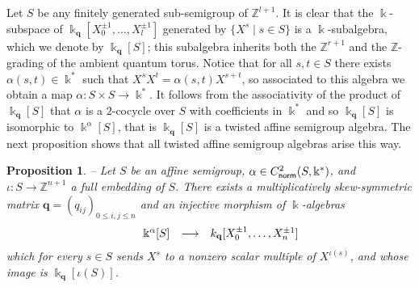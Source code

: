 \documentclass[twoside,11pt]{article}
\newcommand{\norm}{{\sf norm}}
\renewcommand{\k}{\Bbbk}
\newcommand{\Z}{{\mathbb Z}}
\newcommand{\q}{{\mathbf q}}
\newtheorem{subproposition}[subtheorem]{Proposition}
\begin{document}
Let $S$ be any finitely generated sub-semigroup of $\Z^{l+1}$. It is clear that the
$\k$-subspace of $\k_\q[X_0^{\pm 1},\dots,X_l^{\pm 1}]$ generated by $\{X^s \mid s\in S\}$
is a $\k$-subalgebra, which we denote by $\k_\q[S]$; this subalgebra inherits both the
$\Z^{r+1}$ and the $\Z$-grading of the ambient quantum torus. Notice that for all $s,t \in
S$ there exists $\alpha(s,t) \in \k^*$ such that $X^s X^t = \alpha(s,t) X^{s+t}$, so
associated to this algebra we obtain a map $\alpha: S \times S \longrightarrow \k^*$. It
follows from the associativity of the product of $\k_\q[S]$ that $\alpha$ is
a $2$-cocycle over $S$ with coefficients in $\k^*$ and so $\k_\q[S]$ is isomorphic to
$\k^\alpha[S]$, that is $\k_\q[S]$ is a twisted affine semigroup algebra. The next
proposition shows that all twisted affine semigroup algebras arise this way. 

\begin{subproposition} -- \label{full-affine-embedding} 
Let $S$ be an affine semigroup, $\alpha \in C^2_\norm(S,\k^*)$, and $\iota: S
\longrightarrow \Z^{n+1}$ a full embedding of $S$. There exists a multiplicatively
skew-symmetric matrix $\q=(q_{ij})_{0 \le i,j \le n}$ and an injective morphism of
$\k$-algebras
\[
\begin{array}{ccrcl}
 & & \k^\alpha[S] & \longrightarrow & k_\q[X_0^{\pm 1}, \ldots, X_n^{\pm 1}] \cr 
\end{array}
\]
which for every $s \in S$ sends $X^s$ to a nonzero scalar multiple of $X^{\iota(s)}$, and
whose image is $\k_\q[\iota(S)]$.
\end{subproposition}
\end{document}
